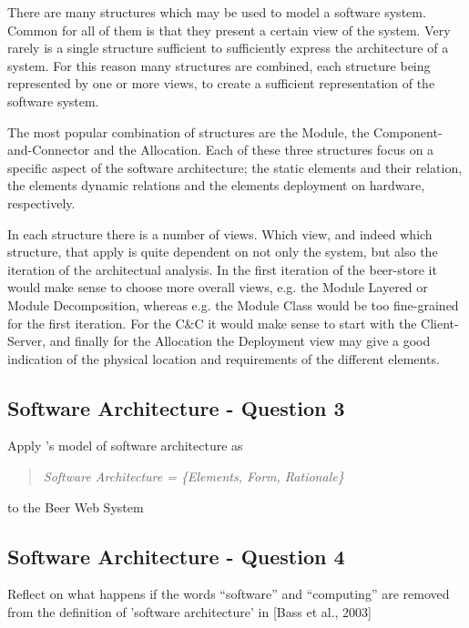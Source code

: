 There are many structures which may be used to model a software system. Common for all of them is that they present a certain view of the system. Very rarely is a single structure sufficient to sufficiently express the architecture of a system. For this reason many structures are combined, each structure being represented by one or more views, to create a sufficient representation of the software system.

The most popular combination of structures are the Module, the Component-and-Connector and the Allocation. Each of these three structures focus on a specific aspect of the software architecture; the static elements and their relation, the elements dynamic relations and the elements deployment on hardware, respectively. 

In each structure there is a number of views. Which view, and indeed which structure, that apply is quite dependent on not only the system, but also the iteration of the architectual analysis. In the first iteration of the beer-store it would make sense to choose more overall views, e.g. the Module Layered or Module Decomposition, whereas e.g. the Module Class would be too fine-grained for the first iteration. For the C\&C it would make sense to start with the Client-Server, and finally for the Allocation the Deployment view may give a good indication of the physical location and requirements of the different elements.

\subsection{Software Architecture - Question 3}

\begin{question}
Apply \cite{perrywolf1992}'s model of software architecture as
\begin{quote}
	{\it Software Architecture = \{Elements, Form, Rationale\}}
\end{quote}
to the Beer Web System
\end{question}


\subsection{Software Architecture - Question 4}

\begin{question}
Reflect on what happens if the words ``software'' and
``computing'' are removed from the definition of 'software
architecture' in [Bass et al., 2003]
\end{question}

